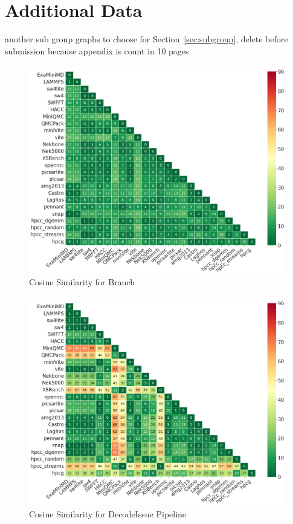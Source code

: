 \appendix
\appendixpage
\section{Additional Data}
\label{appendix:moreData}
\si{another sub group graphs to choose for Section~\ref{sec:subgroup}, delete before submission because appendix is count in 10 pages }
\begin{figure}[ht]
\centering
\includegraphics[width=0.9\linewidth]{figs/Branch.png}
\caption{Cosine Similarity for Branch }
\label{figs:cosine Branch}
\end{figure} 

\begin{figure}[ht]
\centering
\includegraphics[width=0.9\linewidth]{figs/DecodeIssue_Pipeline.png}
\caption{Cosine Similarity for DecodeIssue Pipeline }
\label{figs:cosine DecodeIssue_Pipeline}
\end{figure}

